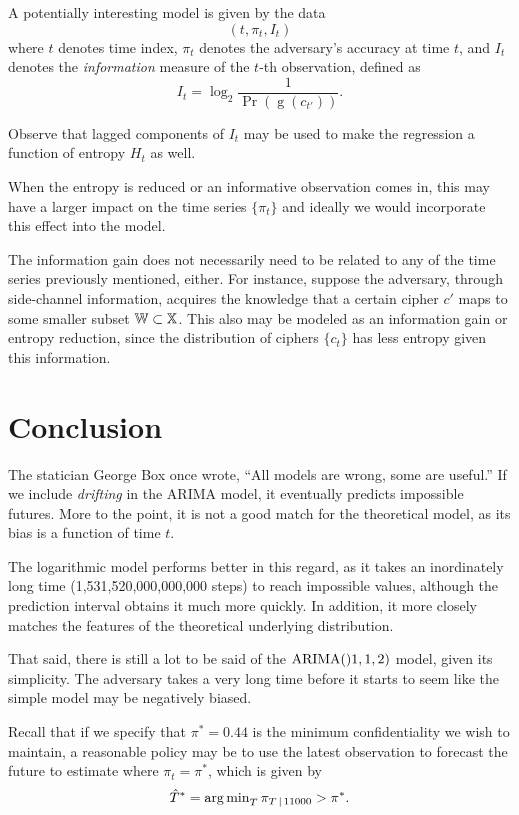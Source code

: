 \documentclass[final,
  11pt,
]{article}
\begin{document}
A potentially interesting model is given by the data \[
  (t, \pi_t, I_t)
\] where \(t\) denotes time index, \(\pi_t\) denotes the adversary's
accuracy at time \(t\), and \(I_t\) denotes the \emph{information}
measure of the \(t\)-th observation, defined as \[
  I_t = \log_2 \frac{1}{\Pr(\operatorname{g}(c_{t'}))}.
\]

Observe that lagged components of \(I_t\) may be used to make the
regression a function of entropy \(H_t\) as well.

When the entropy is reduced or an informative observation comes in, this
may have a larger impact on the time series \(\{\pi_t\}\) and ideally we
would incorporate this effect into the model.

The information gain does not necessarily need to be related to any of
the time series previously mentioned, either. For instance, suppose the
adversary, through side-channel information, acquires the knowledge that
a certain cipher \(c'\) maps to some smaller subset
\(\mathbb{W} \subset \mathbb{X}\). This also may be modeled as an information
gain or entropy reduction, since the distribution of ciphers \(\{c_t\}\)
has less entropy given this information.

\hypertarget{conclusion}{%
\section{Conclusion}\label{conclusion}}
The statician George Box once wrote, ``All models are wrong, some are useful.''
If we include \emph{drifting} in the ARIMA model, it eventually predicts
impossible futures.
More to the point, it is not a good match for the theoretical model, as its
bias is a function of time $t$.

The logarithmic model performs better in this regard, as it takes an
inordinately long time (1,531,520,000,000,000 steps) to reach impossible
values, although the prediction interval obtains it much more quickly.
In addition, it more closely matches the features of the theoretical
underlying distribution.

That said, there is still a lot to be said of the $\operatorname{ARIMA}()1,1,2)$ model,
given its simplicity.
The adversary takes a very long time before it starts to seem like the
simple model may be negatively biased.

Recall that if we specify that $\pi^* = 0.44$ is the minimum confidentiality
we wish to maintain, a reasonable policy may be to use the latest
observation to forecast the future to estimate where $\pi_t = \pi^*$,
which is given by
$$
    \hat{T}^* = \operatorname{arg\,min}_{T} \pi_{T\,|\,11000} > \pi^*.
$$
\end{document}
